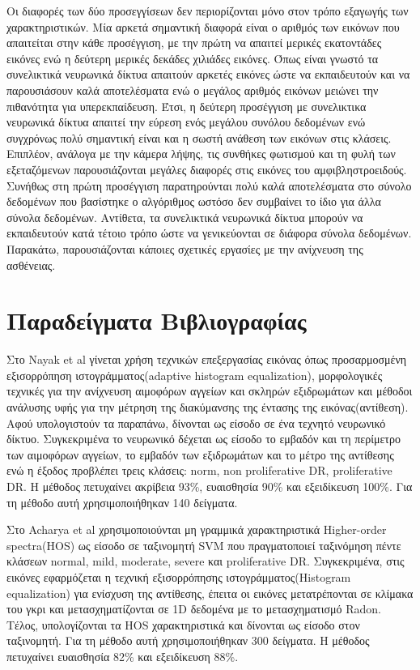 Οι διαφορές των δύο προσεγγίσεων δεν περιορίζονται μόνο στον τρόπο εξαγωγής των χαρακτηριστικών. Μία αρκετά σημαντική διαφορά είναι ο αριθμός των εικόνων που απαιτείται στην κάθε προσέγγιση, με την πρώτη να απαιτεί μερικές εκατοντάδες εικόνες ενώ η δεύτερη μερικές δεκάδες χιλιάδες εικόνες. Όπως είναι γνωστό τα συνελικτικά νευρωνικά δίκτυα απαιτούν αρκετές εικόνες ώστε να εκπαιδευτούν και να παρουσιάσουν καλά αποτελέσματα ενώ ο μεγάλος αριθμός εικόνων μειώνει την πιθανότητα για υπερεκπαίδευση. Έτσι, η δεύτερη προσέγγιση με συνελικτικα νευρωνικά δίκτυα απαιτεί την εύρεση ενός μεγάλου συνόλου δεδομένων ενώ συγχρόνως πολύ σημαντική είναι και η σωστή ανάθεση των εικόνων στις κλάσεις. 
Επιπλέον, ανάλογα με την κάμερα λήψης, τις συνθήκες φωτισμού και τη φυλή των εξεταζόμενων παρουσιάζονται μεγάλες διαφορές στις εικόνες του αμφιβληστροειδούς. Συνήθως στη πρώτη προσέγγιση παρατηρούνται πολύ καλά αποτελέσματα στο σύνολο δεδομένων που βασίστηκε ο αλγόριθμος ωστόσο δεν συμβαίνει το ίδιο για άλλα σύνολα δεδομένων. Αντίθετα,  τα  συνελικτικά νευρωνικά δίκτυα μπορούν να εκπαιδευτούν κατά τέτοιο τρόπο ώστε να γενικεύονται σε διάφορα σύνολα δεδομένων. Παρακάτω, παρουσιάζονται κάποιες σχετικές εργασίες με την ανίχνευση της ασθένειας.

\section{Παραδείγματα Βιβλιογραφίας}
\label{sec:2.2}

Στο Nayak et al\cite{Nayak} γίνεται χρήση τεχνικών επεξεργασίας εικόνας όπως προσαρμοσμένη εξισορρόπηση ιστογράμματος(adaptive histogram equalization), μορφολογικές τεχνικές για την ανίχνευση αιμοφόρων αγγείων και σκληρών εξιδρωμάτων και μέθοδοι ανάλυσης υφής για την μέτρηση της διακύμανσης της έντασης της εικόνας(αντίθεση). Αφού υπολογιστούν τα παραπάνω, δίνονται ως είσοδο σε ένα τεχνητό νευρωνικό δίκτυο. Συγκεκριμένα το νευρωνικό δέχεται ως είσοδο  το εμβαδόν και τη περίμετρο των αιμοφόρων αγγείων, το εμβαδόν των εξιδρωμάτων και το μέτρο της αντίθεσης ενώ η έξοδος  προβλέπει τρεις κλάσεις: norm, non proliferative DR, proliferative DR. Η μέθοδος πετυχαίνει ακρίβεια 93\%, ευαισθησία 90\% και εξειδίκευση 100\%. Για τη μέθοδο αυτή χρησιμοποιήθηκαν 140 δείγματα.



Στο Acharya et al\cite{Acharya2} χρησιμοποιούνται μη γραμμικά χαρακτηριστικά Higher-order spectra(HOS) ως είσοδο σε ταξινομητή SVM που πραγματοποιεί ταξινόμηση πέντε κλάσεων normal, mild, moderate, severe και proliferative DR. Συγκεκριμένα, στις εικόνες εφαρμόζεται η τεχνική εξισορρόπησης ιστογράμματος(Histogram equalization) για ενίσχυση της αντίθεσης, έπειτα οι εικόνες μετατρέπονται σε κλίμακα του γκρι και μετασχηματίζονται σε 1D δεδομένα με το μετασχηματισμό Radon. Τέλος, υπολογίζονται τα HOS χαρακτηριστικά και δίνονται ως είσοδο στον ταξινομητή. Για τη μέθοδο αυτή χρησιμοποιήθηκαν 300 δείγματα. Η μέθοδος πετυχαίνει ευαισθησία 82\% και εξειδίκευση 88\%.


